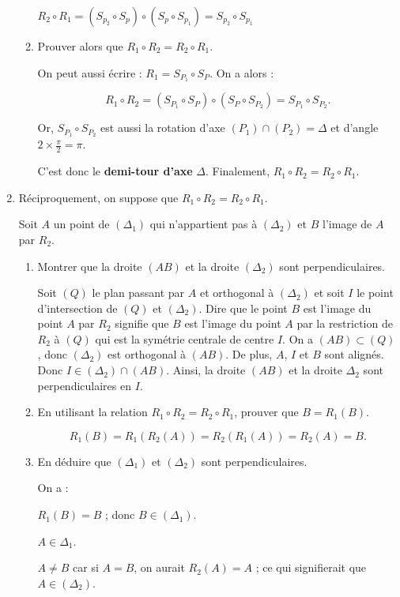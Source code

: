 \documentclass[12pt,a4paper]{article}
\begin{document}
\begin{enumerate}
\begin{enumerate}
		 	\( R_{2} \circ R_{1} = ( S_{p_{2}} \circ S_{p}) \circ (S_{p} \circ S_{p_{1}}) = S_{p_{2}} \circ S_{p_{1}}\)
		\item Prouver alors que $R_1 \circ R_2 = R_2 \circ R_1$.
		
		On peut aussi écrire : $R_1 = S_{P_1} \circ S_P$. On a alors :
		
		\[ R_1 \circ R_2 = (S_{P_1} \circ S_P) \circ (S_P \circ S_{P_2}) = S_{P_1} \circ S_{P_2}. \]
		
		Or, $S_{P_1} \circ S_{P_2}$ est aussi la rotation d’axe $(P_1) \cap (P_2) = \Delta$ et d’angle $2 \times \frac{\pi}{2} = \pi$. 
		
		C’est donc le \textbf{demi-tour d’axe} $\Delta$.
		Finalement, $R_1 \circ R_2 = R_2 \circ R_1$.
\end{enumerate}
\item Réciproquement, on suppose que $R_1 \circ R_2 = R_2 \circ R_1$.
		
		Soit $A$ un point de $(\Delta_1)$ qui n’appartient pas à $(\Delta_2)$ et $B$ l’image de $A$ par $R_2$.
		\begin{enumerate}
			\item Montrer que la droite $(AB)$ et la droite $(\Delta_2)$ sont perpendiculaires.
			
			Soit $(Q)$ le plan passant par $A$ et orthogonal à $(\Delta_2)$ et soit $I$ le point d’intersection de $(Q)$ et $(\Delta_2)$. Dire que le 				point $B$ est l’image du point $A$ par $R_2$ signifie que $B$ est l’image du point $A$ par la restriction de $R_2$ à $(Q)$ qui est la symétrie centrale de centre $I$. On a $(AB) \subset (Q)$, donc $(\Delta_2)$ est orthogonal à $(AB)$. De plus, $A$, $I$ et $B$ sont alignés. Donc $I \in (\Delta_2) \cap (AB)$. Ainsi, la droite $(AB)$ et la droite $\Delta_2$ sont perpendiculaires en $I$.
			
			\item En utilisant la relation $R_1 \circ R_2 = R_2 \circ R_1$, prouver que $B = R_1(B)$.
			
					\[ R_1(B) = R_1(R_2(A)) = R_2(R_1(A)) = R_2(A) = B. \]
					
			\item En déduire que $(\Delta_1)$ et $(\Delta_2)$ sont perpendiculaires.
			
			On a :
			
			$R_1(B) = B$ ; donc $B \in (\Delta_1)$.
			
			$A \in \Delta_1$.
			
			$A \neq B$ car si $A = B$, on aurait $R_2(A) = A$ ; ce qui signifierait que $A \in (\Delta_2)$.
			

\end{enumerate}
\end{enumerate}
\end{document}
